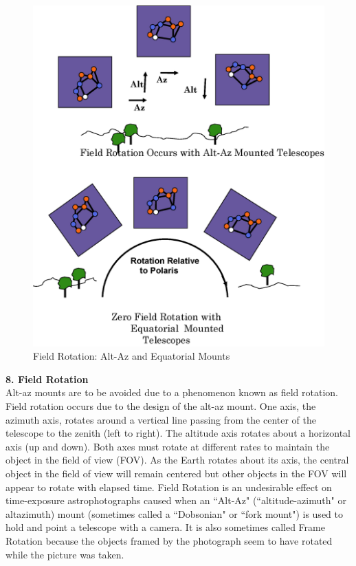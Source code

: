 \documentclass[a4paper,12pt]{extarticle}
\begin{document}
\begin{figure}
	\centering
	\includegraphics[width=\linewidth]{fieldrot.eps}
	\vspace{-1.5cm}
	\caption{Field Rotation: Alt-Az and Equatorial Mounts}
\end{figure}

\textbf{8. Field Rotation}\\

Alt-az mounts are to be avoided due to a phenomenon
known as field rotation. Field rotation occurs due to
the design of the alt-az mount. One axis, the azimuth
axis, rotates around a vertical line passing from the
center of the telescope to the zenith (left to right). The altitude axis rotates about a horizontal axis (up and down). Both axes must rotate at different rates to maintain the object in the field of view (FOV). As the Earth rotates about its axis, the central object in the field of view will remain centered but other objects in the FOV will appear to rotate with elapsed time. Field Rotation is an undesirable effect on time-exposure astrophotographs caused when an ``Alt-Az" (``altitude-azimuth" or altazimuth) mount (sometimes called a ``Dobsonian" or ``fork mount") is used to hold and point a telescope with a camera. It is also sometimes called Frame Rotation because the objects framed by the photograph seem to have rotated while the picture was taken.\\
\end{document}
